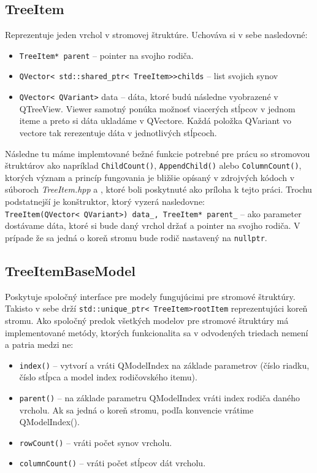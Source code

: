 \subsection{TreeItem}
\label{kap04:sec:tree_item}
Reprezentuje jeden vrchol v stromovej štruktúre. Uchováva si v sebe nasledovné:
\begin{itemize}
\item \texttt{TreeItem* parent} -- pointer na svojho rodiča.
\item \texttt{QVector\textless~std::shared\_ptr\textless~TreeItem\textgreater\textgreater childs} -- list svojich synov
\item \texttt{QVector\textless~QVariant\textgreater} data -- dáta, ktoré budú následne vyobrazené v QTreeView. Viewer samotný ponúka možnosť viacerých stĺpcov v jednom iteme a preto si dáta ukladáme v QVectore. Každá položka QVariant vo vectore tak rerezentuje dáta v jednotlivých stĺpcoch.
\end{itemize} 

Následne tu máme implemtované bežné funkcie potrebné pre prácu so stromovou štruktúrov ako napríklad \texttt{ChildCount()}, \texttt{AppendChild()} alebo \texttt{ColumnCount()}, ktorých význam a princíp fungovania je bližšie opísaný v zdrojvých kódoch v súboroch \textit{TreeItem.hpp} a , ktoré boli poskytnuté ako príloha k tejto práci.
Trochu podstatnejší je konštruktor, ktorý vyzerá nasledovne:
\texttt{TreeItem(QVector\textless~QVariant\textgreater) data\_, TreeItem* parent\_} -- ako parameter dostávame dáta, ktoré si bude daný vrchol držať a pointer na svojho rodiča. V prípade že sa jedná o koreň stromu bude rodič nastavený na \texttt{nullptr}.



\subsection{TreeItemBaseModel}
Poskytuje spoločný interface pre modely fungujúcimi pre stromové štruktúry. Takisto v sebe drží \texttt{std::unique\_ptr\textless~TreeItem\textgreater rootItem} reprezentujúci koreň stromu.  Ako spoločný predok všetkých modelov pre stromové štruktúry má implementované metódy, ktorých funkcionalita sa v odvodených triedach nemení a patria medzi ne:
\begin{itemize}
\item \texttt{index()} -- vytvorí a vráti QModelIndex na základe parametrov (číslo riadku, číslo stĺpca a model index rodičovského itemu).
\item \texttt{parent()} -- na základe parametru QModelIndex vráti index rodiča daného vrcholu. Ak sa jedná o koreň stromu, podľa konvencie vrátime QModelIndex().
\item \texttt{rowCount()} -- vráti počet synov vrcholu.
\item \texttt{columnCount()} -- vráti počet stĺpcov dát vrcholu.
\end{itemize}
 
